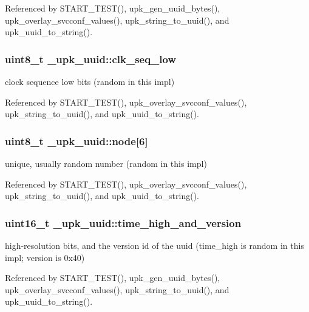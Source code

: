 Referenced by START\_\-TEST(), upk\_\-gen\_\-uuid\_\-bytes(), upk\_\-overlay\_\-svcconf\_\-values(), upk\_\-string\_\-to\_\-uuid(), and upk\_\-uuid\_\-to\_\-string().

\subsubsection[{clk\_\-seq\_\-low}]{\setlength{\rightskip}{0pt plus 5cm}uint8\_\-t {\bf \_\-upk\_\-uuid::clk\_\-seq\_\-low}}\label{struct__upk__uuid_a0cdb0fa230c786e2ae9994ce31df60fd}
clock sequence low bits (random in this impl) 

Referenced by START\_\-TEST(), upk\_\-overlay\_\-svcconf\_\-values(), upk\_\-string\_\-to\_\-uuid(), and upk\_\-uuid\_\-to\_\-string().

\subsubsection[{node}]{\setlength{\rightskip}{0pt plus 5cm}uint8\_\-t {\bf \_\-upk\_\-uuid::node}[6]}\label{struct__upk__uuid_ab13ebc728fe2ee9b46d44a65fe3dd640}
unique, usually random number (random in this impl) 

Referenced by START\_\-TEST(), upk\_\-overlay\_\-svcconf\_\-values(), upk\_\-string\_\-to\_\-uuid(), and upk\_\-uuid\_\-to\_\-string().

\subsubsection[{time\_\-high\_\-and\_\-version}]{\setlength{\rightskip}{0pt plus 5cm}uint16\_\-t {\bf \_\-upk\_\-uuid::time\_\-high\_\-and\_\-version}}\label{struct__upk__uuid_abd1232f0887919e662a772b94b465670}
high-\/resolution bits, and the version id of the uuid (time\_\-high is random in this impl; version is 0x40) 

Referenced by START\_\-TEST(), upk\_\-gen\_\-uuid\_\-bytes(), upk\_\-overlay\_\-svcconf\_\-values(), upk\_\-string\_\-to\_\-uuid(), and upk\_\-uuid\_\-to\_\-string().

